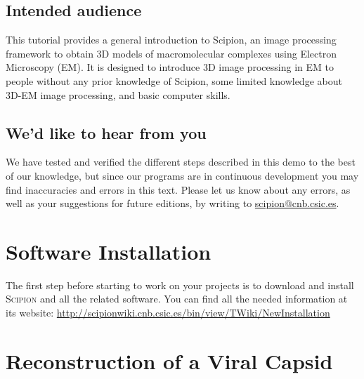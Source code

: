 \documentclass[12pt]{article} %
\newcommand{\scipion}{\textsc{Scipion} }
\begin{document}


\subsection*{Intended audience}

This tutorial provides a general introduction to Scipion, an image
processing framework to obtain 3D models of macromolecular complexes
using Electron Microscopy (EM). It is designed to introduce 3D image
processing in EM to people without any prior knowledge of Scipion,
some limited knowledge about 3D-EM image processing, and basic
computer skills.

\subsection*{We'd like to hear from you}

We have tested and verified the different steps described in this demo
to the best of our knowledge, but since our programs are in continuous
development you may find inaccuracies and errors in this text. Please
let us know about any errors, as well as your suggestions for
future editions, by writing to
\href{mailto:scipion@cnb.csic.es}{scipion@cnb.csic.es}.

\newpage



\tableofcontents %

\newpage %


\section{Software Installation}

The first step before starting to work on your projects is to download
and install \scipion and all the related software. You can find all
the needed information at its website:
\url{http://scipionwiki.cnb.csic.es/bin/view/TWiki/NewInstallation}

\section{Reconstruction of a Viral Capsid}
\end{document}
